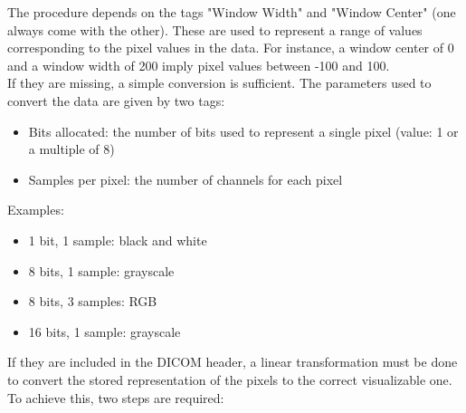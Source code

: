 The procedure depends on the tags "Window Width" and "Window Center" (one always come with the other). These are used to represent a range of values corresponding to the pixel values in the data. For instance, a window center of 0 and a window width of 200 imply pixel values between -100 and 100.\\
If they are missing, a simple conversion is sufficient. The parameters used to convert the data are given by two tags: 
\begin{itemize}
	\item Bits allocated: the number of bits used to represent a single pixel (value: 1 or a multiple of 8)
	\item Samples per pixel: the number of channels for each pixel

\end{itemize}
\newpage
\noindent Examples: 
\begin{itemize}
\item 1 bit, 1 sample: black and white
\item 8 bits, 1 sample: grayscale
\item 8 bits, 3 samples: RGB
\item 16 bits, 1 sample: grayscale

\end{itemize} 

\noindent If they are included in the DICOM header, a linear transformation must be done to convert the stored representation of the pixels to the correct visualizable one. To achieve this, two steps are required: 

